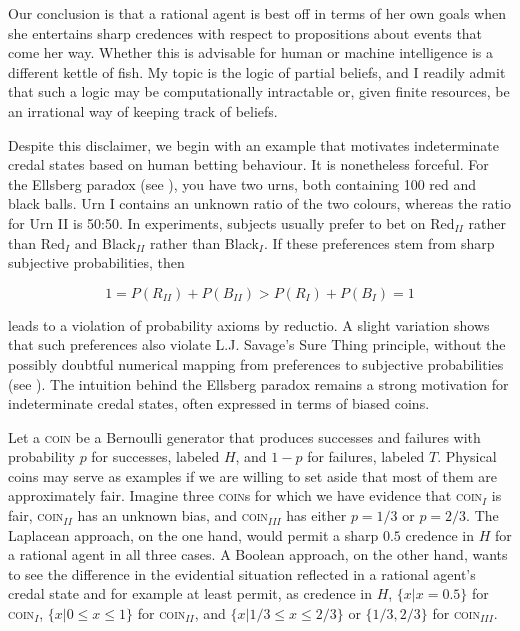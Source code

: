 \documentclass[11pt]{article}
\begin{document}
Our conclusion is that a rational agent is best off in terms of her
own goals when she entertains sharp credences with respect to
propositions about events that come her way. Whether this is advisable
for human or machine intelligence is a different kettle of fish. My
topic is the logic of partial beliefs, and I readily admit that such a
logic may be computationally intractable or, given finite resources,
be an irrational way of keeping track of beliefs.

Despite this disclaimer, we begin with an example that motivates
indeterminate credal states based on human betting behaviour. It is
nonetheless forceful. For the Ellsberg paradox (see
), you  have two urns, both containing 100
red and black balls. Urn I contains an unknown ratio of the two
colours, whereas the ratio for Urn II is 50:50. In experiments,
subjects usually prefer to bet on Red$_{II}$ rather than Red$_{I}$ and
Black$_{II}$ rather than Black$_{I}$. If these preferences stem from
sharp subjective probabilities, then 

\begin{equation}
  \label{eq:s1}
  1=P(R_{II})+P(B_{II})>P(R_{I})+P(B_{I})=1
\end{equation}

leads to a violation of probability axioms by reductio. A slight
variation shows that such preferences also violate L.J. Savage's Sure
Thing principle, without the possibly doubtful numerical mapping from
preferences to subjective probabilities (see
). The intuition behind the Ellsberg
paradox remains a strong motivation for indeterminate credal states, often
expressed in terms of biased coins.

Let a \textsc{coin} be a Bernoulli generator that produces successes
and failures with probability $p$ for successes, labeled $H$, and
$1-p$ for failures, labeled $T$. Physical coins may serve as examples
if we are willing to set aside that most of them are approximately
fair. Imagine three \textsc{coin}s for which we have evidence that
\textsc{coin}$_{I}$ is fair, \textsc{coin}$_{II}$ has an unknown bias,
and \textsc{coin}$_{III}$ has either $p=1/3$ or $p=2/3$. The Laplacean
approach, on the one hand, would permit a sharp $0.5$ credence in $H$
for a rational agent in all three cases. A Boolean approach, on the
other hand, wants to see the difference in the evidential situation
reflected in a rational agent's credal state and for example at least
permit, as credence in $H$, $\{x|x=0.5\}$ for \textsc{coin}$_{I}$,
$\{x|0\leq{}x\leq{}1\}$ for \textsc{coin}$_{II}$, and
$\{x|1/3\leq{}x\leq{}2/3\}$ or $\{1/3,2/3\}$ for
\textsc{coin}$_{III}$.
\end{document}
